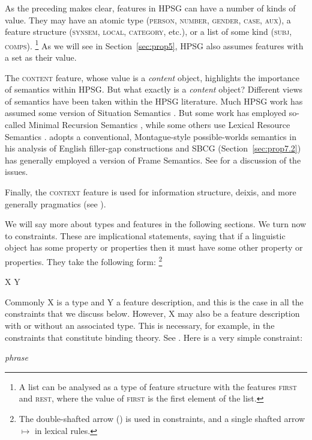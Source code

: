 \documentclass[output=paper
	        ,collection
	        ,collectionchapter
 	        ,biblatex
                ,babelshorthands
                ,newtxmath
                ,draftmode
                ,colorlinks, citecolor=brown
]{langscibook}
\begin{document}
As the preceding makes clear, features in HPSG can have a number of kinds of value. They may have an atomic type (\textsc{person, number, gender, case, aux}), a feature structure (\textsc{synsem, local, category}, etc.), or a list of some kind (\textsc{subj, comps}).%
%
\footnote{A list can be analysed as a type of feature structure with the features \textsc{first} and \textsc{rest}, where the value of \textsc{first} is the first element of the list.}
%
As we will see in Section~\ref{sec:prop5}, HPSG also assumes features with a set as their value.

The \textsc{content} feature, whose value is a \emph{content} object, highlights the importance of semantics within HPSG. But what exactly is a \emph{content} object? Different views of semantics have been taken within the HPSG literature. Much HPSG work has assumed some version of Situation Semantics \citep{BP83a}. But some work has employed so-called Minimal Recursion Semantics \citep{CFPS2005a}, while some others use Lexical Resource Semantics \citep{RS2004a-u}. \citet[501]{Sag2010b} adopts a conventional, Montague-style possible-worlds semantics in his analysis of English filler-gap constructions and SBCG (Section~\ref{sec:prop7.2}) has generally employed a version of Frame Semantics. See  for a discussion of the issues.

Finally, the \textsc{context} feature is used for information structure, deixis, and more generally pragmatics (see ).

We will say more about types and features in the following sections. We turn now to constraints. These are implicational statements, saying that if a linguistic object has some property or properties then it must have some other property or properties. They take the following form:%
%
\footnote{The double-shafted arrow (\impl) is used in constraints, and a single shafted arrow $\mapsto$ in lexical rules.}
%

\ea\label{ex:prop10}
X \impl Y
\z

Commonly X is a type and Y a feature description, and this is the case in all the constraints that we discuss below. However, X may also be a feature description with or without an associated type. This is necessary, for example, in the constraints that constitute binding theory. See . Here is a very simple constraint:

\ea\label{ex:prop11}
\emph{phrase} 
\z
\end{document}

